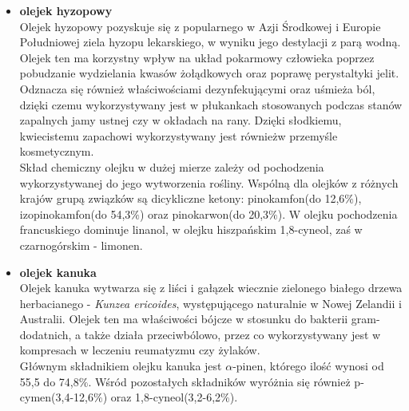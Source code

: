 \documentclass[11pt,a4paper]{report}
\begin{document}
\begin{itemize}
\item \textbf{olejek hyzopowy}\\
Olejek hyzopowy pozyskuje się z popularnego w Azji Środkowej i Europie Południowej ziela hyzopu lekarskiego, w wyniku jego destylacji z parą wodną. Olejek ten ma korzystny wpływ na układ pokarmowy człowieka poprzez pobudzanie wydzielania kwasów żołądkowych oraz poprawę perystaltyki jelit. Odznacza się również  właściwościami dezynfekującymi oraz uśmieża ból, dzięki czemu wykorzystywany jest w płukankach stosowanych podczas stanów zapalnych jamy ustnej czy w okładach na rany. Dzięki słodkiemu, kwiecistemu  zapachowi wykorzystywany jest równieżw przemyśle kosmetycznym\cite{gorailis, ruminska}.\\
Skład chemiczny olejku w dużej mierze zależy od pochodzenia wykorzystywanej do jego wytworzenia rośliny. Wspólną dla olejków z różnych krajów grupą związków są dicykliczne ketony: pinokamfon(do 12,6$\%$), izopinokamfon(do 54,3$\%$) oraz pinokarwon(do 20,3$\%$). W olejku pochodzenia francuskiego dominuje linanol, w olejku hiszpańskim 1,8-cyneol, zaś w czarnogórskim - limonen\cite{gorailis}.


\item \textbf{olejek kanuka}\\
Olejek kanuka wytwarza się z liści i gałązek wiecznie zielonego białego drzewa herbacianego - \textit{Kunzea ericoides}, występującego naturalnie w Nowej Zelandii i Australii\cite{lis}. Olejek ten ma właściwości bójcze w stosunku do bakterii gram-dodatnich, a także działa przeciwbólowo, przez co wykorzystywany jest w kompresach w leczeniu reumatyzmu czy żylaków\cite{pollena_k, brud2001}.\\
Głównym składnikiem olejku kanuka jest $\alpha$-pinen, którego ilość wynosi od 55,5 do 74,8$\%$. Wśród pozostałych składników wyróżnia się również p-cymen(3,4-12,6$\%$) oraz 1,8-cyneol(3,2-6,2$\%$)\cite{manukaikanuka, lis}.


\end{itemize}
\end{document}
